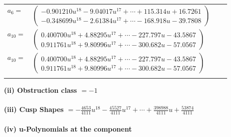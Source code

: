 \documentclass[1p]{elsarticle_modified}
\theoremstyle{definition}
\begin{document}
\begin{tabular}{m{7pt} m{180pt} m{7pt} m{180pt} }
\flushright $a_{6}=$&$\begin{pmatrix}-0.901210 u^{18}-9.04017 u^{17}+\cdots+115.314 u+16.7261\\-0.348699 u^{18}-2.61384 u^{17}+\cdots-168.918 u-39.7808\end{pmatrix}$ \\
\flushright $a_{10}=$&$\begin{pmatrix}0.400700 u^{18}+4.88295 u^{17}+\cdots-227.797 u-43.5867\\0.911761 u^{18}+9.80996 u^{17}+\cdots-300.682 u-57.0567\end{pmatrix}$\\ \flushright $a_{10}=$&$\begin{pmatrix}0.400700 u^{18}+4.88295 u^{17}+\cdots-227.797 u-43.5867\\0.911761 u^{18}+9.80996 u^{17}+\cdots-300.682 u-57.0567\end{pmatrix}$\\&\end{tabular}
\flushleft \textbf{(ii) Obstruction class $= -1$}\\~\\
\flushleft \textbf{(iii) Cusp Shapes $= -\frac{4653}{4111} u^{18}-\frac{45527}{4111} u^{17}+\cdots+\frac{398988}{4111} u+\frac{53874}{4111}$}\\~\\
\newpage\renewcommand{\arraystretch}{1}
\flushleft \textbf{(iv) u-Polynomials at the component}\newline \\
\end{document}
